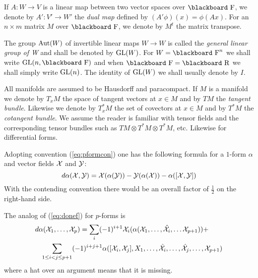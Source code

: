 \documentclass[12pt,titlepage]{article}
\def\bbf#1{\hbox{\blackboard #1}}
\def\lF{\bbf F}
\def\lR{\bbf R}
\def\cX{{\cal X}}
\def\cY{{\cal Y}}
\def\Aut{\hbox{Aut}}
\def\GL{\hbox{GL}}
\begin{document}
If \(A:W \to V\) is a linear map between two vector spaces over \(\lF\),
we denote by \(A':V'\to W'\)
%
 the {\em dual map\/}
%
defined by
\((A'\phi)(x) = \phi(Ax)\). For an \(n\times m\) matrix \(M\) over
\(\lF\), we denote by \(M^t\) the matrix transpose. 

The group \(\Aut(W)\) of invertible linear maps \(W \to W\) is called
the {\em general linear group of W\/} 
%
and shall be denoted by \(\GL(W)\).
\index{\(GL(W)\)@\(\GL(W)\)}%
For \(W=\lF^n\) we shall write \(\GL(n, \lF)\)
\index{\(GL(n,F)\)@\(\GL(n, \lF)\)}%
and when \(\lF=\lR\) we shall simply write 
\(\GL(n)\). 
\index{\(GL(n)\)@\(\GL(n)\)}%
The identity of \(\GL(W)\) we shall usually denote by 
\(I\).

All manifolds are assumed to be Hausdorff and paracompact.
If \(M\) is a manifold we denote by \(T_xM\) the
space of tangent vectors at \(x\in M\) and by \(TM\) the 
{\em tangent bundle\/}.
%
Likewise we denote by \(T^*_xM\) the set of covectors at  \(x\in M\) and
by \(T^*M\) the
{\em cotangent bundle\/}. 
%
We assume the reader is familiar with tensor fields and the
corresponding tensor bundles such as \(TM\otimes T^*M \otimes T^*M\), etc.
Likewise for differential forms. 

Adopting convention (\ref{eq:pformcon}) one has the following formula
for a \(1\)-form \(\alpha\) and vector fields \(\cX\) and \(\cY\):
\begin{equation}\label{eq:donef}%
d\alpha(\cX,\cY) = \cX(\alpha(\cY)) -\cY(\alpha(\cX)) -\alpha([\cX,\cY])
\end{equation}%
With the contending convention there would be an overall factor of
\(\frac{1}{2}\) on the right-hand side. 

The analog of (\ref{eq:donef}) for \(p\)-forms is
\begin{eqnarray}\nonumber
\lefteqn{d\alpha(\cX_1,\dots,\cX_p) = \sum_i(-1)^{i+1} 
\cX_i(\alpha(\cX_1,\dots,\hat \cX_i,\dots \cX_{p+1})) +}\\ \label{eq:dpf}
& & \sum_{1\le i < j \le p+1}(-1)^{i+j+1}
\alpha([\cX_i,\cX_j],X_1,\dots,\hat \cX_i, \dots,
\hat\cX_j,\dots,\cX_{p+1})
\end{eqnarray}
where a hat over an argument means that it is missing. 
\end{document}
